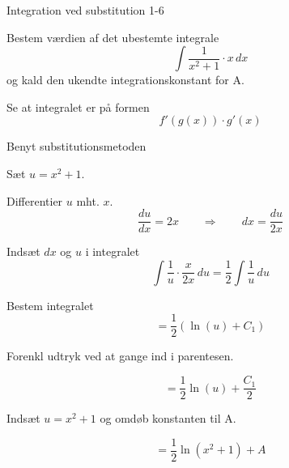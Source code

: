 \documentclass{article}
\begin{document}
\begin{exercise}{Integration ved substitution 1-6}
	
	
	Bestem værdien af det ubestemte integrale
	\[
	\int \frac{1}{x^2+1}\cdot x \, dx
	\]
	og kald den ukendte integrationskonstant for A.
	
	
	
	
	\hint
	
	Se at integralet er på formen
	\[
	f'(g(x)) \cdot g'(x)
	\]
	
	\hint
	
	Benyt substitutionsmetoden
	
	\hint
	
	Sæt $u=x^2+1$.
	
	
	\hint
	
	Differentier $u$ mht. $x$.
	\[
	\frac{du}{dx} = 2x \qquad	\Rightarrow \qquad dx = \frac{du}{2x}
	\]
	
	\hint
	
	Indsæt $dx$ og $u$ i integralet
	\[
	\int \frac{1}{u} \cdot \frac{x}{2x} \, du = \frac{1}{2} \int \frac{1}{u} \, du
	\]
	
	\hint
	
	Bestem integralet
	\[
	= \frac{1}{2} \left( \ln(u) + C_1 \right)
	\]
	
	\hint
	Forenkl udtryk ved at gange ind i parentesen.
	
	\hint
	
	\[
	= \frac{1}{2} \ln(u) + \frac{C_1}{2}
	\]
	
	\hint
	
	Indsæt $u = x^2+1$ og omdøb konstanten  til A.
	
	\hint
	
	\[
	= \frac{1}{2} \ln(x^2+1) + A
	\]
	
	
\end{exercise}

\newpage
\end{document}
